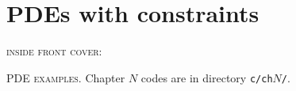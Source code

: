 \documentclass{tufte-book}
\newcommand{\CODELOC}{}  %
\newcommand{\stubinput}[2]{}
\newcommand{\stubinput}[2]{\vspace{5cm} \centerline{\LARGE Percent completed:  \Huge #2\%.} \vfill}
\theoremstyle{definition}
\begin{document}
\chapter{PDEs with constraints}
\label{chap:co}
\renewcommand{\CODELOC}{ch11/}
\stubinput{constrained.tex}{20}


\backmatter




\clearpage

\newcommand{\tblockeqncode}[3]{
\begin{tabular}[t]{l} #1 \\ \quad {\normalsize \texttt{#3}} \\ \qquad \fbox{\small #2} \end{tabular}
}
\newcommand{\tblockcode}[2]{
\begin{tabular}[t]{l} #1 \\ \quad {\normalsize \texttt{#2}} \end{tabular}
}
\newcommand{\tblock}[1]{
\begin{tabular}[t]{l} #1 \end{tabular}
}

\clearpage
\thispagestyle{empty}
\noindent \textsc{inside front cover:}

\vfill
{\large \noindent \textsc{PDE examples}.} \quad Chapter $N$ codes are in directory \texttt{c/ch}$N$\texttt{/}.
\end{document}
